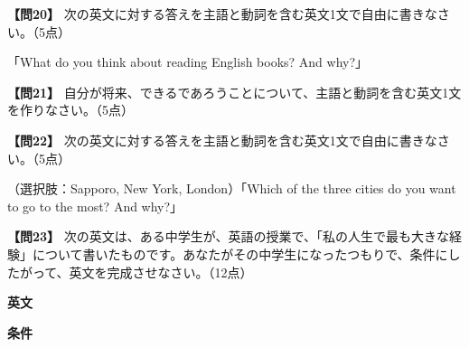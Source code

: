 \testsectsep
\testquestionwide
\noindent\textbf{【問20】} 次の英文に対する答えを主語と動詞を含む英文1文で自由に書きなさい。（5点）

\noindent「What do you think about reading English books? And why?」

\testqsep
\testquestionwide
\noindent\textbf{【問21】} 自分が将来、できるであろうことについて、主語と動詞を含む英文1文を作りなさい。（5点）

\testqsep
\testquestionwide
\noindent\textbf{【問22】} 次の英文に対する答えを主語と動詞を含む英文1文で自由に書きなさい。（5点）

\noindent（選択肢：Sapporo, New York, London）「Which of the three cities do you want to go to the most? And why?」

\vspace{0.5em}
\testqsep

\newpage
\testquestionwide
\noindent\textbf{【問23】} 次の英文は、ある中学生が、英語の授業で、「私の人生で最も大きな経験」について書いたものです。あなたがその中学生になったつもりで、条件にしたがって、英文を完成させなさい。（12点）

\vspace{0.5em}
\noindent\textbf{英文}

\noindent{}%

\vspace{0.5em}
\noindent\textbf{条件}

\noindent{}%

